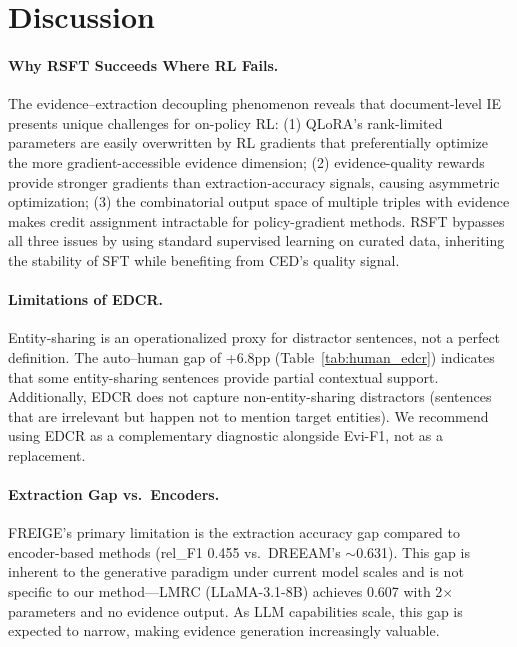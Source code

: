 \documentclass[11pt,a4paper]{article}
\newcommand{\method}{FREIGE}
\newcommand{\edcr}{EDCR}
\newcommand{\rsft}{RSFT}
\begin{document}
\section{Discussion}
\label{sec:discussion}

\paragraph{Why \rsft{} Succeeds Where RL Fails.}
The evidence--extraction decoupling phenomenon reveals that document-level IE presents unique challenges for on-policy RL: (1) QLoRA's rank-limited parameters are easily overwritten by RL gradients that preferentially optimize the more gradient-accessible evidence dimension; (2) evidence-quality rewards provide stronger gradients than extraction-accuracy signals, causing asymmetric optimization; (3) the combinatorial output space of multiple triples with evidence makes credit assignment intractable for policy-gradient methods.
\rsft{} bypasses all three issues by using standard supervised learning on curated data, inheriting the stability of SFT while benefiting from CED's quality signal.

\paragraph{Limitations of \edcr{}.}
Entity-sharing is an operationalized proxy for distractor sentences, not a perfect definition.
The auto--human gap of +6.8pp (Table~\ref{tab:human_edcr}) indicates that some entity-sharing sentences provide partial contextual support.
Additionally, \edcr{} does not capture non-entity-sharing distractors (sentences that are irrelevant but happen not to mention target entities).
We recommend using \edcr{} as a complementary diagnostic alongside Evi-F1, not as a replacement.

\paragraph{Extraction Gap vs.\ Encoders.}
\method{}'s primary limitation is the extraction accuracy gap compared to encoder-based methods (rel\_F1 0.455 vs.\ DREEAM's ${\sim}$0.631).
This gap is inherent to the generative paradigm under current model scales and is not specific to our method---LMRC (LLaMA-3.1-8B) achieves 0.607 with 2$\times$ parameters and no evidence output.
As LLM capabilities scale, this gap is expected to narrow, making evidence generation increasingly valuable.
\end{document}
